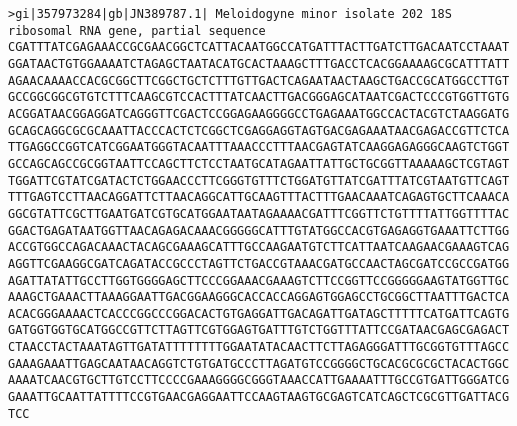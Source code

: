 \documentclass[11pt]{article}
\begin{document}
\begin{Verbatim}[commandchars=\\\{\}]
>gi|357973284|gb|JN389787.1| Meloidogyne minor isolate 202 18S ribosomal RNA gene, partial sequence
CGATTTATCGAGAAACCGCGAACGGCTCATTACAATGGCCATGATTTACTTGATCTTGACAATCCTAAAT
GGATAACTGTGGAAAATCTAGAGCTAATACATGCACTAAAGCTTTGACCTCACGGAAAAGCGCATTTATT
AGAACAAAACCACGCGGCTTCGGCTGCTCTTTGTTGACTCAGAATAACTAAGCTGACCGCATGGCCTTGT
GCCGGCGGCGTGTCTTTCAAGCGTCCACTTTATCAACTTGACGGGAGCATAATCGACTCCCGTGGTTGTG
ACGGATAACGGAGGATCAGGGTTCGACTCCGGAGAAGGGGCCTGAGAAATGGCCACTACGTCTAAGGATG
GCAGCAGGCGCGCAAATTACCCACTCTCGGCTCGAGGAGGTAGTGACGAGAAATAACGAGACCGTTCTCA
TTGAGGCCGGTCATCGGAATGGGTACAATTTAAACCCTTTAACGAGTATCAAGGAGAGGGCAAGTCTGGT
GCCAGCAGCCGCGGTAATTCCAGCTTCTCCTAATGCATAGAATTATTGCTGCGGTTAAAAAGCTCGTAGT
TGGATTCGTATCGATACTCTGGAACCCTTCGGGTGTTTCTGGATGTTATCGATTTATCGTAATGTTCAGT
TTTGAGTCCTTAACAGGATTCTTAACAGGCATTGCAAGTTTACTTTGAACAAATCAGAGTGCTTCAAACA
GGCGTATTCGCTTGAATGATCGTGCATGGAATAATAGAAAACGATTTCGGTTCTGTTTTATTGGTTTTAC
GGACTGAGATAATGGTTAACAGAGACAAACGGGGGCATTTGTATGGCCACGTGAGAGGTGAAATTCTTGG
ACCGTGGCCAGACAAACTACAGCGAAAGCATTTGCCAAGAATGTCTTCATTAATCAAGAACGAAAGTCAG
AGGTTCGAAGGCGATCAGATACCGCCCTAGTTCTGACCGTAAACGATGCCAACTAGCGATCCGCCGATGG
AGATTATATTGCCTTGGTGGGGAGCTTCCCGGAAACGAAAGTCTTCCGGTTCCGGGGGAAGTATGGTTGC
AAAGCTGAAACTTAAAGGAATTGACGGAAGGGCACCACCAGGAGTGGAGCCTGCGGCTTAATTTGACTCA
ACACGGGAAAACTCACCCGGCCCGGACACTGTGAGGATTGACAGATTGATAGCTTTTTCATGATTCAGTG
GATGGTGGTGCATGGCCGTTCTTAGTTCGTGGAGTGATTTGTCTGGTTTATTCCGATAACGAGCGAGACT
CTAACCTACTAAATAGTTGATATTTTTTTTGGAATATACAACTTCTTAGAGGGATTTGCGGTGTTTAGCC
GAAAGAAATTGAGCAATAACAGGTCTGTGATGCCCTTAGATGTCCGGGGCTGCACGCGCGCTACACTGGC
AAAATCAACGTGCTTGTCCTTCCCCGAAAGGGGCGGGTAAACCATTGAAAATTTGCCGTGATTGGGATCG
GAAATTGCAATTATTTTCCGTGAACGAGGAATTCCAAGTAAGTGCGAGTCATCAGCTCGCGTTGATTACG
TCC


\end{Verbatim}
\end{document}
